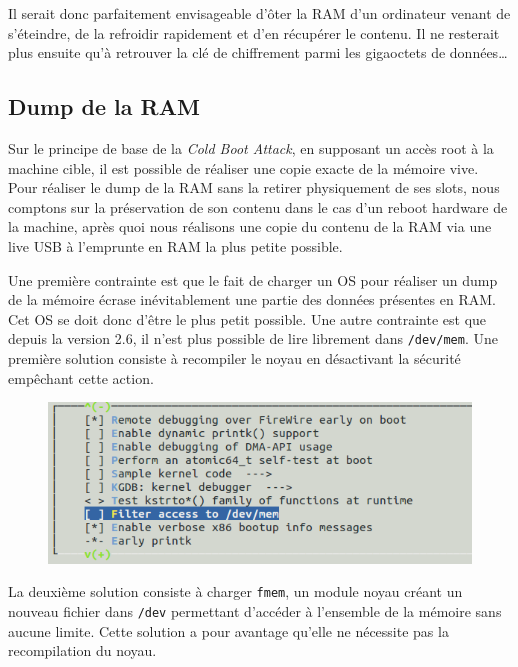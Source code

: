\documentclass[12pt,a4paper]{article}
\begin{document}
Il serait donc parfaitement envisageable d'ôter la RAM d'un ordinateur venant
de s'éteindre, de la refroidir rapidement et d'en récupérer le contenu. Il ne
resterait plus ensuite qu'à retrouver la clé de chiffrement parmi les
gigaoctets de données\dots


\subsection{Dump de la RAM}

Sur le principe de base de la \textit{Cold Boot Attack}, en supposant un accès
root à la machine cible, il est possible de réaliser une copie exacte de la
mémoire vive. Pour réaliser le dump de la RAM sans la retirer physiquement
de ses slots, nous comptons sur la préservation de son contenu dans le cas d'un
reboot hardware de la machine, après quoi nous réalisons une copie du contenu
de la RAM via une live USB à l'emprunte en RAM la plus petite possible.

Une première contrainte est que le fait de charger un OS pour réaliser un dump
de la mémoire écrase inévitablement une partie des données présentes en RAM.
Cet OS se doit donc d'être le plus petit possible.  Une autre contrainte est
que depuis la version 2.6, il n'est plus possible de lire librement dans
\texttt{/dev/mem}. Une première solution consiste à recompiler le noyau en désactivant
la sécurité empêchant cette action.

\begin{figure}[H]
  \begin{center}
    \includegraphics[width=15cm]{img/kernel.png}
  \end{center}
\end{figure}

La deuxième solution consiste à charger \texttt{fmem}, un module noyau créant
un nouveau fichier dans \texttt{/dev} permettant d'accéder à l'ensemble de la mémoire
sans aucune limite. Cette solution a pour avantage qu'elle ne nécessite pas la
recompilation du noyau.
\end{document}
